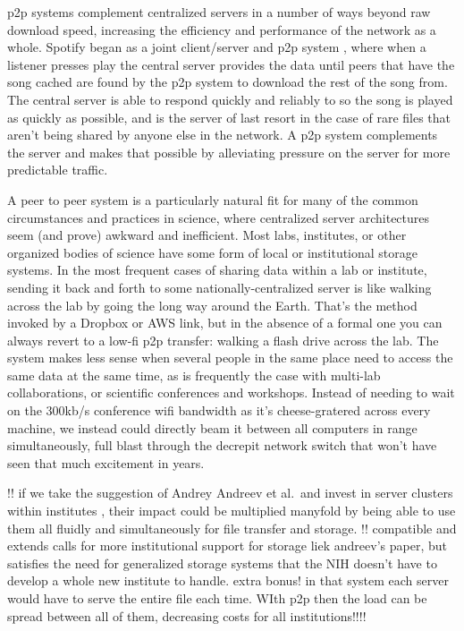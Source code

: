 \documentclass[10pt]{tufte-book}
\begin{document}
p2p systems complement centralized servers in a number of ways beyond
raw download speed, increasing the efficiency and performance of the
network as a whole. Spotify began as a joint client/server and p2p
system \citep{kreitzSpotifyLargeScale2010b} , where when a
listener presses play the central server provides the data until peers
that have the song cached are found by the p2p system to download the
rest of the song from. The central server is able to respond quickly and
reliably to so the song is played as quickly as possible, and is the
server of last resort in the case of rare files that aren't being shared
by anyone else in the network. A p2p system complements the server and
makes that possible by alleviating pressure on the server for more
predictable traffic.

A peer to peer system is a particularly natural fit for many of the
common circumstances and practices in science, where centralized server
architectures seem (and prove) awkward and inefficient. Most labs,
institutes, or other organized bodies of science have some form of local
or institutional storage systems. In the most frequent cases of sharing
data within a lab or institute, sending it back and forth to some
nationally-centralized server is like walking across the lab by going
the long way around the Earth. That's the method invoked by a Dropbox or
AWS link, but in the absence of a formal one you can always revert to a
low-fi p2p transfer: walking a flash drive across the lab. The system
makes less sense when several people in the same place need to access
the same data at the same time, as is frequently the case with multi-lab
collaborations, or scientific conferences and workshops. Instead of
needing to wait on the 300kb/s conference wifi bandwidth as it's
cheese-gratered across every machine, we instead could directly beam it
between all computers in range simultaneously, full blast through the
decrepit network switch that won't have seen that much excitement in
years.

!! if we take the suggestion of Andrey Andreev et al.~and invest in
server clusters within institutes \citep{andreevBiologistsNeedModern2021, charlesCommunityDrivenBigOpen2020} ,
their impact could be multiplied manyfold by being able to use them all
fluidly and simultaneously for file transfer and storage. !! compatible
and extends calls for more institutional support for storage liek
andreev's paper, but satisfies the need for generalized storage systems
that the NIH doesn't have to develop a whole new institute to handle.
extra bonus! in that system each server would have to serve the entire
file each time. WIth p2p then the load can be spread between all of
them, decreasing costs for all institutions!!!!
\end{document}
